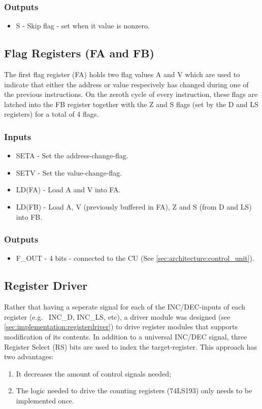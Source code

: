 \subsubsection*{Outputs}
\begin{itemize}
\itemsep0em 
\item S - Skip flag - set when it value is nonzero.
\end{itemize}

\subsection{Flag Registers (FA and FB)} \label{sec:architecture:flags}
The first flag register (FA) holds two flag values A and V which are used to indicate that either the address or value respecively has changed during one of the previous instructions. On the zeroth cycle of every instruction, these flags are latched into the FB register together with the Z and S flags (set by the D and LS registers) for a total of 4 flags.

\subsubsection*{Inputs}
\begin{itemize}
\itemsep0em 
\item SETA - Set the address-change-flag.
\item SETV - Set the value-change-flag.
\item LD(FA) - Load A and V into FA.
\item LD(FB) - Load A, V (previously buffered in FA), Z and S (from D and LS) into FB. 
\end{itemize}

\subsubsection*{Outputs}
\begin{itemize}
\itemsep0em 
\item F\_OUT - 4 bits - connected to the CU (See \ref{sec:architecture:control_unit}).
\end{itemize}


\subsection{Register Driver} \label{sec:architecture:registerdriver}
Rather that having a seperate signal for each of the INC/DEC-inputs of each register (e.g.~ INC\_D, INC\_LS, etc), a driver module was designed (see \ref{sec:implementation:registerdriver}) to drive register modules that supports modification of its contents. In addition to a universal INC/DEC signal, three Register Select (RS) bits are used to index the target-register. This approach has two advantages:
\begin{enumerate}
\item It decreases the amount of control signals needed;
\item The logic needed to drive the counting registers (74LS193) only needs to be implemented once.
\end{enumerate}

